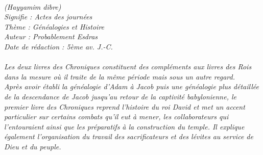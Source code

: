 \BFont
\noindent\hrulefill
{\footnotesize
\textit{
\bigskip
{\centering{}
\\(Hayyamim dibre)
\\Signifie : Actes des journées
\\Thème : Généalogies et Histoire
\\Auteur : Probablement Esdras
\\Date de rédaction : 5ème av. J.-C.\\}
}
\textit{
\\Les deux livres des Chroniques constituent des compléments aux livres des Rois dans la mesure où il traite de la même période mais sous un autre regard.
\\Après avoir établi la généalogie d’Adam à Jacob puis une généalogie plus détaillée de la descendance de Jacob jusqu’au retour de la captivité babylonienne, le premier livre des Chroniques reprend l’histoire du roi David et met un accent particulier sur certains combats qu’il eut à mener, les collaborateurs qui l’entouraient ainsi que les préparatifs à la construction du temple. Il explique également l’organisation du travail des sacrificateurs et des lévites au service de Dieu et du peuple.\bigskip
}
}
\par\nobreak\noindent\hrulefill
